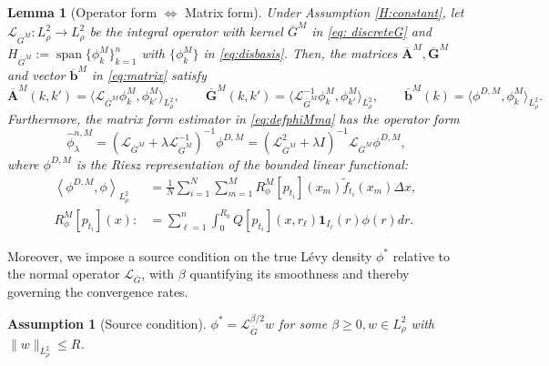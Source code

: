 \documentclass[12pt]{article}
\def\Gbar{ {\overline{G}} }
\def\Abar{ {\overline{A}} }
\def\bbar{ {\overline{b}} }
\newtheorem{lemma}[theorem]{Lemma}
\numberwithin{equation}{section}
\numberwithin{theorem}{section}
\newtheorem{assumption}{Assumption}
\begin{document}
\begin{lemma}[Operator form $\Leftrightarrow$ Matrix form]\label{lem:opma} 
Under Assumption {\rm \ref{H:constant}}, let $\mathcal{L}_{\Gbar^M}:L_\rho^2\to L_\rho^2$ be the integral operator with kernel $\Gbar^M$ in \eqref{eq: discreteG} and $H_{\Gbar^M} := \operatorname{span}\{\phi_k^M\}_{k=1}^n$ with $\{\phi_k^M\}$ in \eqref{eq:disbasis}. Then, the matrices $\mathbf{\Abar}^M, \mathbf{\Gbar}^M$ and vector $\mathbf{\bbar} ^M$ in \eqref{eq:matrix} satisfy 
$$
\mathbf{\Abar}^M(k, k')
= \langle \mathcal{L}_{\Gbar^M}\phi_k^M,\phi_{k'}^M\rangle_{L_\rho^2},\qquad
\mathbf{\Gbar}^M(k, k')
= \langle \mathcal{L}_{\Gbar^M}^{-1}\phi_k^M,\phi_{k'}^M\rangle_{L_\rho^2},\qquad
\mathbf{\bbar} ^M(k)
= \langle \phi^{D,M},\phi_k^M\rangle_{L_\rho^2}.
$$
Furthermore, the matrix form estimator in \eqref{eq:defphiMma} has the operator form 
\begin{equation}
\label{eq:defphiMop}    
\hat\phi_\lambda^{n,M} = (\mathcal{L}_{\Gbar^M} + \lambda \mathcal{L}_{\Gbar^M}^{-1})^{-1}\phi^{D,M} =  (\mathcal{L}_{\Gbar^M}^2 + \lambda I)^{-1}\mathcal{L}_{\Gbar^M}\phi^{D,M}, 
\end{equation}
where $\phi^{D,M}$ is the Riesz representation of the bounded linear functional:  
\begin{equation}
\label{eq:RieszM}
\begin{aligned} 
\left\langle \phi^{D,M},\phi \right\rangle_{L_\rho^2}
& = \frac{1}{N}\sum_{i=1}^N\sum_{m=1}^M 
  R_\phi^M[p_{t_i}](x_m)\tilde f_{t_i}(x_m)\Delta x, \, \\
R_\phi^M\left[p_{t_i}\right](x):&=\sum_{\ell=1}^n \int_0^{R_0} Q\left[p_{t_i}\right](x, r_{\ell})\mathbf{1}_{I_{\ell}}(r) \phi(r) d r.
\end{aligned}
\end{equation}
\end{lemma}



Moreover, we impose a source condition on the true L\'evy density $\phi^*$ relative to the normal operator $\mathcal{L}_{\Gbar}$, with $\beta$ quantifying its smoothness and thereby governing the convergence rates. 
\begin{assumption}[Source condition]
\label{H:source_condi}
$\phi^*=\mathcal{L}_{\Gbar}^{\beta / 2} w$ for some $\beta \geq 0, w \in L_\rho^2$ with $\|w\|_{L_\rho^2} \leq R$. 
\end{assumption}
\end{document}
